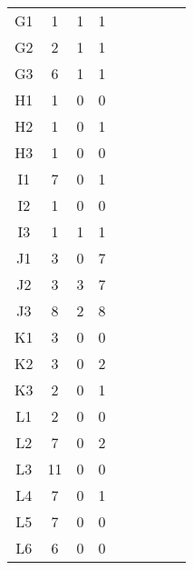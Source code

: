 \begin{center}
\begin{longtable}{ccccc|cccc}
G1    & 1     & 1     & 1 \\
G2    & 2     & 1     & 1 \\
G3    & 6     & 1     & 1 \\
H1    & 1     & 0     & 0 \\
H2    & 1     & 0     & 1 \\
H3    & 1     & 0     & 0 \\
I1    & 7     & 0     & 1 \\
I2    & 1     & 0     & 0 \\
I3    & 1     & 1     & 1 \\
J1    & 3     & 0     & 7 \\
J2    & 3     & 3     & 7 \\
J3    & 8     & 2     & 8 \\
K1    & 3     & 0     & 0 \\
K2    & 3     & 0     & 2 \\
K3    & 2     & 0     & 1 \\
L1    & 2     & 0     & 0 \\
L2    & 7     & 0     & 2 \\
L3    & 11    & 0     & 0 \\
L4    & 7     & 0     & 1 \\
L5    & 7     & 0     & 0 \\
L6    & 6     & 0     & 0 \\


\end{longtable}
\end{center}

